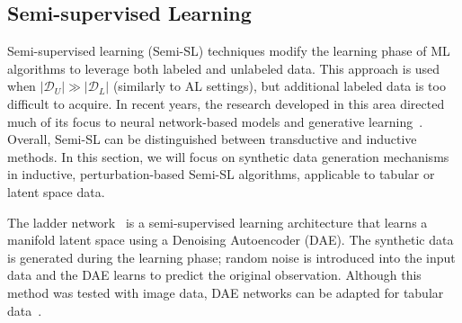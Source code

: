 % 
% 
% 
% 

\subsection{Semi-supervised Learning}\label{sec:semi-supervised-learning-synth}

Semi-supervised learning (Semi-SL) techniques modify the learning phase of ML
algorithms to leverage both labeled and unlabeled data. This approach is used
when $|\mathcal{D}_U| \gg |\mathcal{D}_L|$ (similarly to AL settings), but
additional labeled data is too difficult to acquire. In recent years,
the research developed in this area directed much of its focus to neural
network-based models and generative learning~\cite{van2020survey}. Overall,
Semi-SL can be distinguished between transductive and inductive methods. In
this section, we will focus on synthetic data generation mechanisms in
inductive, perturbation-based Semi-SL algorithms, applicable to tabular or
latent space data.

The ladder network~\cite{rasmus2015semi} is a semi-supervised learning
architecture that learns a manifold latent space using a Denoising
Autoencoder (DAE). The synthetic data is generated during the learning phase;
random noise is introduced into the input data and the DAE learns to predict
the original observation. Although this method was tested with image data,
DAE networks can be adapted for tabular data~\cite{sattarov2022explaining}.


